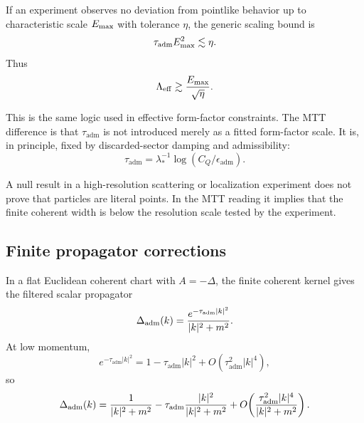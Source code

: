 \documentclass[11pt]{article}
\newcommand{\ta}{\tau_{\mathrm{adm}}}
\newcommand{\epsadm}{\epsilon_{\mathrm{adm}}}
\begin{document}
If an experiment observes no deviation from pointlike behavior up to characteristic scale
\(E_{\rm max}\) with tolerance \(\eta\), the generic scaling bound is
\begin{equation}
  \ta E_{\rm max}^2\lesssim \eta.
  \label{eq:phen-tau-bound}
\end{equation}
Thus
\begin{equation}
  \Lambda_{\rm eff}
  \gtrsim
  \frac{E_{\rm max}}{\sqrt{\eta}}.
  \label{eq:phen-lambda-bound}
\end{equation}

This is the same logic used in effective form-factor constraints. The MTT difference is that
\(\ta\) is not introduced merely as a fitted form-factor scale. It is, in principle, fixed by
discarded-sector damping and admissibility:
\begin{equation}
  \ta
  =
  \lambda_\ast^{-1}\log(C_Q/\epsadm).
  \label{eq:phen-tau-fixed}
\end{equation}

\begin{remark}
\label{rem:null-results-pointlike}
A null result in a high-resolution scattering or localization experiment does not prove that
particles are literal points. In the MTT reading it implies that the finite coherent width is
below the resolution scale tested by the experiment.
\end{remark}

\subsection{Finite propagator corrections}
\label{subsec:finite-propagator-corrections}

In a flat Euclidean coherent chart with \(A=-\Delta\), the finite coherent kernel gives the
filtered scalar propagator
\begin{equation}
  \Delta_{\rm adm}(k)
  =
  \frac{e^{-\ta |k|^2}}{|k|^2+m^2}.
  \label{eq:phen-propagator}
\end{equation}
At low momentum,
\begin{equation}
  e^{-\ta |k|^2}
  =
  1-\ta |k|^2+O(\ta^2|k|^4),
\end{equation}
so
\begin{equation}
  \Delta_{\rm adm}(k)
  =
  \frac{1}{|k|^2+m^2}
  -
  \ta\frac{|k|^2}{|k|^2+m^2}
  +
  O\!\left(
  \frac{\ta^2|k|^4}{|k|^2+m^2}
  \right).
  \label{eq:phen-propagator-expansion}
\end{equation}
\end{document}
